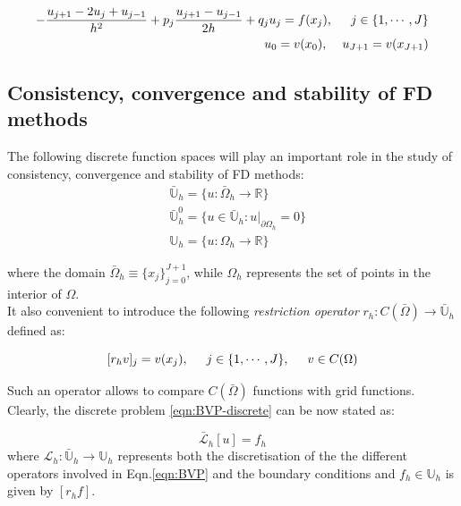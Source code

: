 \documentclass[11pt]{article}
\theoremstyle{theorem}
\theoremstyle{definition}
\begin{document}
\begin{align}\label{eqn:BVP-discrete}
\begin{split}
-\frac{u_{j+1}-2u_j+u_{j-1}}{h^2}+p_j\frac{u_{j+1}-u_{j-1}}{2h}+q_ju_j=f(x_j), \hspace{5mm}j\in\lbrace 1, \cdots, J\rbrace\\
u_0=v(x_0),\hspace{4mm} u_{J+1}=v(x_{J+1})
\end{split}
\end{align}
	
\subsection{Consistency, convergence and stability of FD methods}
The following discrete function spaces will play an important role in the study of consistency, convergence and stability of FD methods:
\begin{align*}
	&\bar{\mathbb{U}}_h=\lbrace u:\bar{\Omega}_h\rightarrow\mathbb{R}\rbrace\\
	&\bar{\mathbb{U}}^0_h=\lbrace u\in\bar{\mathbb{U}}_h : u|_{\partial\Omega_h}=0\rbrace\\
	&{\mathbb{U}}_h=\lbrace u:\Omega_h\rightarrow\mathbb{R}\rbrace
\end{align*}

where the domain $\bar{\Omega}_h\equiv\lbrace x_j\rbrace_{j=0}^{J+1}$, while $\Omega_h$ represents the set of points in the interior of $\Omega$.\\
It also convenient to introduce the following \emph{restriction operator} $r_h:C(\bar{\Omega})\rightarrow\bar{\mathbb{U}}_h$ defined as:

$$[r_h v]_j=v(x_j),\hspace{5mm}j\in\lbrace 1, \cdots, J\rbrace,\hspace{5mm} v\in C(\Omega)$$

Such an operator allows to compare $C(\bar{\Omega})$ functions with grid functions.\\

Clearly, the discrete problem \eqref{eqn:BVP-discrete} can be now stated as:

\begin{equation}
	\label{eqn:BVP-general-discr}
\end{equation}
$$\bar{\mathcal{L}}_h[u]=f_h$$
where $\mathcal{L}_h:\bar{\mathbb{U}}_h\rightarrow\mathbb{U}_h$ represents both the discretisation of the the different operators involved in Eqn.\eqref{eqn:BVP} and the boundary conditions and $f_h\in\mathbb{U}_h$ is given by $[r_hf]$.\\
\end{document}

